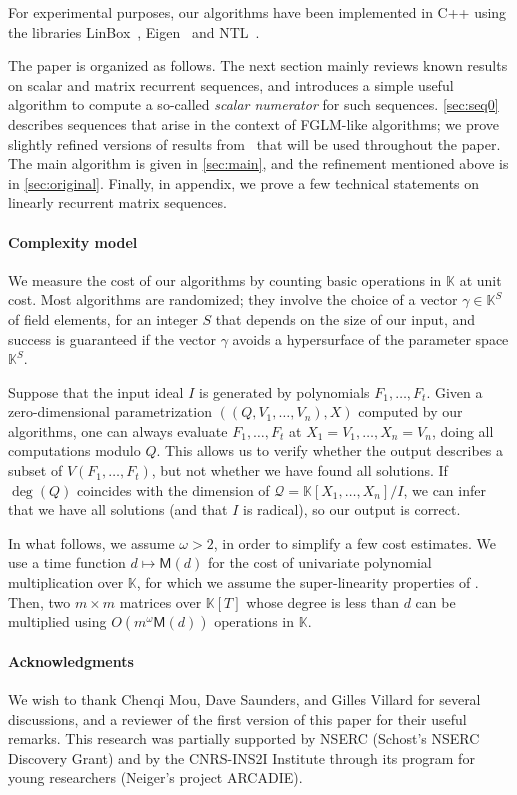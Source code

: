\documentclass[final,1p,times,authoryear]{elsarticle}
\newcommand{\lf}{X}
\newcommand{\residueI}{\mathscr{Q}}
\newcommand{\sqfree}{Q}
\def\M {\ensuremath{\mathsf{M}}}
\def\K{\mathbb{K}}
\def\K {\ensuremath{\mathbb{K}}}
\begin{document}
For experimental purposes, our algorithms have been implemented in C++ using
the libraries LinBox~\citep{LinBox}, Eigen~\citep{Eigen} and NTL~\citep{NTL}.

The paper is organized as follows. The next section mainly reviews
known results on scalar and matrix recurrent sequences, and introduces
a simple useful algorithm to compute a so-called {\em scalar
  numerator} for such sequences. \cref{sec:seq0} describes sequences
that arise in the context of FGLM-like algorithms; we prove slightly
refined versions of results from~\citep{BoSaSc03} that will be used
throughout the paper. The main algorithm is given in \cref{sec:main},
and the refinement mentioned above is in \cref{sec:original}.
Finally, in appendix, we prove a few technical statements on linearly
recurrent matrix sequences.

\paragraph{Complexity model}
We measure the cost of our algorithms by counting basic operations in
$\K$ at unit cost. Most algorithms are randomized; they involve the
choice of a vector $\gamma \in \K^S$ of field elements, for an integer
$S$ that depends on the size of our input, and success is guaranteed
if the vector $\gamma$ avoids a hypersurface of the parameter space
$\K^S$.

Suppose that the input ideal $I$ is generated by polynomials
$F_1,\dots,F_t$.  Given a zero-dimensional parametrization
$((\sqfree,V_1,\dots,V_n),\lf)$ computed by our algorithms, one can
always evaluate $F_1,\dots,F_t$ at $X_1 =V_1,\dots,X_n=V_n$, doing all
computations modulo $\sqfree$. This allows us to verify whether the
output describes a subset of $V(F_1,\dots,F_t)$, but not whether we
have found all solutions.  If $\deg(Q)$ coincides with the dimension
of $\residueI=\K[X_1,\dots,X_n]/I$, we can infer that we have all
solutions (and that $I$ is radical), so our output is correct.

In what follows, we assume $\omega>2$, in order to simplify a few cost
estimates. We use a time function $d \mapsto \M(d)$ for the cost of
univariate polynomial multiplication over $\K$, for which we assume
the super-linearity properties of \citep[Section~8.4]{GaGe13}.  Then,
two $m\times m$ matrices over $\K[T]$ whose degree is less than $d$
can be multiplied using $O(m^\omega \M(d))$ operations in $\K$.

\paragraph{Acknowledgments} We wish to thank Chenqi Mou, Dave Saunders, and
Gilles Villard for several discussions, and a reviewer of the first
version of this paper for their useful remarks. This research was
partially supported by NSERC (Schost's NSERC Discovery Grant) and by
the CNRS-INS2I Institute through its program for young researchers
(Neiger's project ARCADIE).
\end{document}

